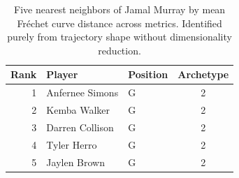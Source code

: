 \begin{table}[htbp]
  \centering\small
  \begin{tabular}{rllc}
    \toprule
    Rank & Player & Position & Archetype \\
    \midrule
    1 & Anfernee Simons & G & 2 \\
    2 & Kemba Walker & G & 2 \\
    3 & Darren Collison & G & 2 \\
    4 & Tyler Herro & G & 2 \\
    5 & Jaylen Brown & G & 2 \\
    \bottomrule
  \end{tabular}
  \caption{Five nearest neighbors of Jamal Murray by mean Fr\'{e}chet curve distance across metrics. Identified purely from trajectory shape without dimensionality reduction.}
  \label{tab:Jamal_Murray_frechet_curve_neighbors}
\end{table}

